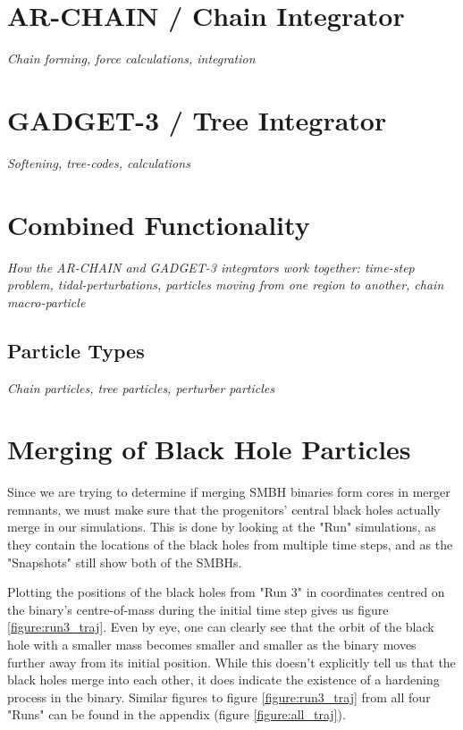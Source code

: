 \documentclass[english, oneside]{HYgradu}
\begin{document}
\section{AR-CHAIN / Chain Integrator}

\textit{Chain forming, force calculations, integration}

\section{GADGET-3 / Tree Integrator}

\textit{Softening, tree-codes, calculations}

\section{Combined Functionality}

\textit{How the AR-CHAIN and GADGET-3 integrators work together: time-step problem, tidal-perturbations, particles moving from one region to another, chain macro-particle}

\subsection{Particle Types}

\textit{Chain particles, tree particles, perturber particles}

\section{Merging of Black Hole Particles}

Since we are trying to determine if merging SMBH binaries form cores in merger remnants, we must make sure that the progenitors' central black holes actually merge in our simulations. This is done by looking at the "Run" simulations, as they contain the locations of the black holes from multiple time steps, and as the "Snapshots" still show both of the SMBHs.

Plotting the positions of the black holes from "Run 3" in coordinates centred on the binary's centre-of-mass during the initial time step gives us figure \ref{figure:run3_traj}. Even by eye, one can clearly see that the orbit of the black hole with a smaller mass becomes smaller and smaller as the binary moves further away from its initial position. While this doesn't explicitly tell us that the black holes merge into each other, it does indicate the existence of a hardening process in the binary. Similar figures to figure \ref{figure:run3_traj} from all four "Runs" can be found in the appendix (figure \ref{figure:all_traj}).
\end{document}
